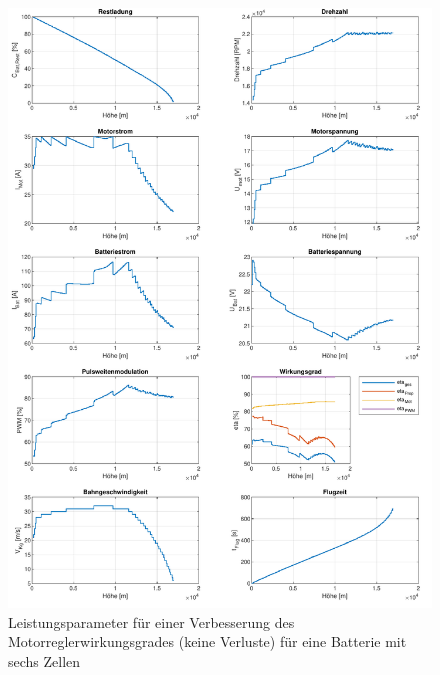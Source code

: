 \begin{appendix}
\begin{figure}[H]
\centering
	\includegraphics[scale=0.7]{Diagramme/Untersuchung_eta_pwm_1_6.pdf}
	\caption{Leistungsparameter für einer Verbesserung des Motorreglerwirkungsgrades (keine Verluste) für eine Batterie mit sechs Zellen}
	\label{abb:eta_pwm_6_1}
\end{figure}


\end{appendix}

